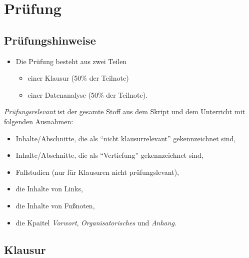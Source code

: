 \documentclass[12pt,ngerman,]{book}
\providecommand{\tightlist}{%
  \setlength{\itemsep}{0pt}\setlength{\parskip}{0pt}}
\begin{document}
\section{Prüfung}\label{prufung}

\subsection{Prüfungshinweise}\label{prufungshinweise}

\begin{itemize}
\tightlist
\item
  Die Prüfung besteht aus zwei Teilen

  \begin{itemize}
  \tightlist
  \item
    einer Klausur (50\% der Teilnote)
  \item
    einer Datenanalyse (50\% der Teilnote).
  \end{itemize}
\end{itemize}

\emph{Prüfungsrelevant} ist der gesamte Stoff aus dem Skript und dem
Unterricht mit folgenden Ausnahmen:

\begin{itemize}
\tightlist
\item
  Inhalte/Abschnitte, die als ``nicht klausurrelevant'' gekennzeichnet
  sind,
\item
  Inhalte/Abschnitte, die als ``Vertiefung'' gekennzeichnet sind,
\item
  Fallstudien (nur für Klausuren nicht prüfungslevant),
\item
  die Inhalte von Links,
\item
  die Inhalte von Fußnoten,
\item
  die Kpaitel \emph{Vorwort}, \emph{Organisatorisches} und
  \emph{Anhang}.
\end{itemize}

\subsection{Klausur}\label{klausur}
\end{document}
